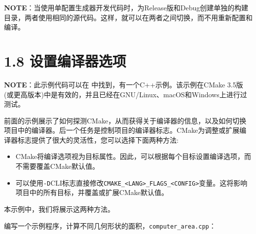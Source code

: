 
\begin{myInfoBox}
\textbf{NOTE}：当使用单配置生成器开发代码时，为Release版和Debug创建单独的构建目录，两者使用相同的源代码。这样，就可以在两者之间切换，而不用重新配置和编译。
\end{myInfoBox}


\section{1.8 设置编译器选项}

\begin{myInfoBox}
\textbf{NOTE}：此示例代码可以在  中找到，有一个C++示例。该示例在CMake 3.5版(或更高版本)中是有效的，并且已经在GNU/Linux、macOS和Windows上进行过测试。
\end{myInfoBox}

前面的示例展示了如何探测CMake，从而获得关于编译器的信息，以及如何切换项目中的编译器。后一个任务是控制项目的编译器标志。CMake为调整或扩展编译器标志提供了很大的灵活性，您可以选择下面两种方法:

\begin{itemize}
\item CMake将编译选项视为目标属性。因此，可以根据每个目标设置编译选项，而不需要覆盖CMake默认值。

\item 可以使用\texttt{-D}CLI标志直接修改\texttt{CMAKE\_<LANG>\_FLAGS\_<CONFIG>}变量。这将影响项目中的所有目标，并覆盖或扩展CMake默认值。

\end{itemize}

本示例中，我们将展示这两种方法。


编写一个示例程序，计算不同几何形状的面积，\texttt{computer\_area.cpp}：


